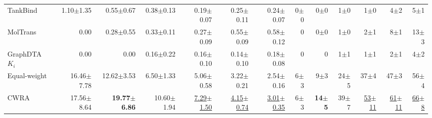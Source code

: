 \begin{table}[htbp!]
\begin{tabular}{lrrrrrr|rrrrrr}
TankBind & 1.10$\pm$1.35 & 0.55$\pm$0.67 & 0.38$\pm$0.13 & 0.19$\pm$0.07 & 0.25$\pm$0.11 & 0.24$\pm$0.07 & 0$\pm$0 & 0$\pm$0 & 1$\pm$0 & 1$\pm$0 & 4$\pm$2 & 5$\pm$1 \\
MolTrans & 0.00 & 0.28$\pm$0.55 & 0.33$\pm$0.11 & 0.27$\pm$0.09 & 0.55$\pm$0.09 & 0.58$\pm$0.12 & 0 & 0$\pm$0 & 1$\pm$0 & 2$\pm$1 & 8$\pm$1 & 13$\pm$3 \\
GraphDTA $K_{i}$ & 0.00 & 0.00 & 0.16$\pm$0.22 & 0.16$\pm$0.10 & 0.14$\pm$0.10 & 0.18$\pm$0.08 & 0 & 0 & 1$\pm$1 & 1$\pm$1 & 2$\pm$1 & 4$\pm$2 \\
\midrule
Equal-weight & 16.46$\pm$7.78 & 12.62$\pm$3.53 & 6.50$\pm$1.33 & 5.06$\pm$0.58 & 3.22$\pm$0.21 & 2.54$\pm$0.16 & 6$\pm$3 & 9$\pm$3 & 24$\pm$5 & 37$\pm$4 & 47$\pm$3 & 56$\pm$4 \\
CWRA & 17.56$\pm$8.64 & \textbf{19.77$\pm$6.86} & 10.60$\pm$1.94 & \underline{7.29$\pm$1.50} & \underline{4.15$\pm$0.74} & \underline{3.01$\pm$0.35} & 6$\pm$3 & \textbf{14$\pm$5} & 39$\pm$7 & \underline{53$\pm$11} & \underline{61$\pm$11} & \underline{66$\pm$8} \\
\bottomrule
\end{tabular}
\end{table}
